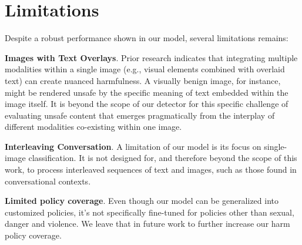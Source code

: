 \section{Limitations}

Despite a robust performance shown in our model, several limitations remains:

\noindent\textbf{Images with Text Overlays}. Prior research \citep{liu2024mm} indicates that integrating multiple modalities within a single image (e.g., visual elements combined with overlaid text) can create nuanced harmfulness. A visually benign image, for instance, might be rendered unsafe by the specific meaning of text embedded within the image itself. It is beyond the scope of our detector for this specific challenge of evaluating unsafe content that emerges pragmatically from the interplay of different modalities co-existing within one image.

\noindent\textbf{Interleaving Conversation}. A limitation of our model is its focus on single-image classification. It is not designed for, and therefore beyond the scope of this work, to process interleaved sequences of text and images, such as those found in conversational contexts.

\noindent\textbf{Limited policy coverage}. Even though our model can be generalized into customized policies, it's not specifically fine-tuned for policies other than sexual, danger and violence. We leave that in future work to further increase our harm policy coverage.
